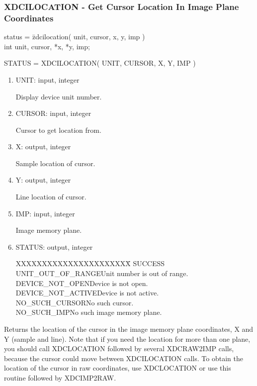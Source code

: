 \subsubsection{XDCILOCATION - Get Cursor Location In Image Plane Coordinates}
\begin{tabbing}
status = \=zdcilocation( unit, cursor, x, y, imp )\\
\>int  unit, cursor, *x, *y, imp;\\
\end{tabbing}
STATUS = XDCILOCATION( UNIT, CURSOR, X, Y, IMP )
\begin{enumerate}
\item UNIT:  input, integer

Display device unit number.
\item CURSOR:  input, integer

Cursor to get location from.
\item X:  output, integer

Sample location of cursor.
\item Y:  output, integer

Line location of cursor.
\item IMP:  input, integer

Image memory plane.
\item STATUS:  output, integer
\begin{tabbing}
XXXXXXXXXXXXXXXXXXXXXX\=\kill
SUCCESS\\
UNIT\_OUT\_OF\_RANGE\>Unit number is out of range.\\
DEVICE\_NOT\_OPEN\>Device is not open.\\
DEVICE\_NOT\_ACTIVE\>Device is not active.\\
NO\_SUCH\_CURSOR\>No such cursor.\\
NO\_SUCH\_IMP\>No such image memory plane.\\
\end{tabbing}
\end{enumerate}
Returns the location of the cursor in the image memory plane coordinates,
X and Y (sample and line).  Note that if you need the location for more
than one plane, you should call XDCLOCATION followed by several 
XDCRAW2IMP calls, because the cursor could move between XDCILOCATION
calls.  To obtain the location of the cursor in raw coordinates, use
XDCLOCATION or use this routine followed by XDCIMP2RAW.
\newpage
